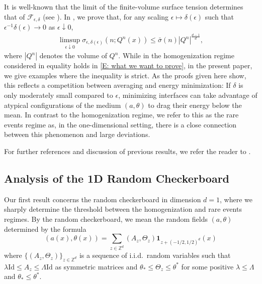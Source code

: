 \documentclass[12pt]{amsart}
\begin{document}
It is well-known that the limit of the finite-volume surface tension determines that of $\mathscr{F}_{\epsilon,\delta}$ (see \cite{ansini_braides_chiado-piat,morfe}).  In \cite[Theorem 2]{part1}, we prove that, for any scaling $\epsilon \mapsto \delta(\epsilon)$ such that $\epsilon^{-1} \delta(\epsilon) \to 0$ as $\epsilon \downarrow 0$, 
	\begin{align} \label{E: what we want to prove}
		\limsup_{\epsilon \downarrow 0} \sigma_{\epsilon,\delta(\epsilon)} ( n ; Q^{n}(x) ) \leq \bar{\sigma}(n) | Q^{n} |^{ \frac{ d - 1 }{ d } } ,
	\end{align} 
where $ | Q^{n} |$ denotes the volume of $Q^{n}$.  While in the homogenization regime considered in \cite{part1} equality holds in \eqref{E: what we want to prove}, in the present paper, we give examples where the inequality is strict.  As the proofs given here show, this reflects a competition between averaging and energy minimization: If $\delta$ is only moderately small compared to $\epsilon$, minimizing interfaces can take advantage of atypical configurations of the medium $(a,\theta)$ to drag their energy below the mean.  In contrast to the homogenization regime, we refer to this as the rare events regime as, in the one-dimensional setting, there is a close connection between this phenomenon and large deviations.

For further references and discussion of previous results, we refer the reader to \cite{part1}.

\subsection{Analysis of the 1D Random Checkerboard} Our first result concerns the random checkerboard in dimension $d = 1$, where we sharply determine the threshold between the homogenization and rare events regimes.  By the random checkerboard, we mean the random fields $(a,\theta)$ determined by the formula
	\begin{equation} \label{E: one d random checkerboard}
		(a(x),\theta(x)) = \sum_{z \in \mathbb{Z}^{d}} (A_{z},\Theta_{z}) \boldsymbol{1}_{ z + (-1/2,1/2)^{d} }(x)
	\end{equation}  
where $\{ (A_{z},\Theta_{z} ) \}_{z \in \mathbb{Z}^{d}}$ is a sequence of i.i.d.\ random variables such that $\lambda \text{Id} \leq A_{z} \leq \Lambda \text{Id}$ as symmetric matrices and $\theta_{*} \leq \Theta_{z} \leq \theta^{*}$ for some positive $\lambda \leq \Lambda$ and $ \theta_{*} \leq \theta^{*}$.
\end{document}
